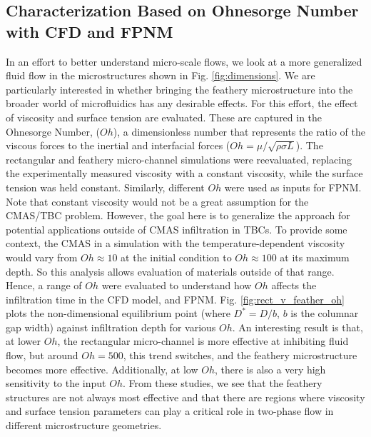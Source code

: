 \documentclass{UCF_ETD}
\begin{document}
\subsection{Characterization Based on Ohnesorge Number with CFD and FPNM}

In an effort to better understand micro-scale flows, we look at a more generalized fluid flow in the microstructures shown in Fig. \ref{fig:dimensions}. We are particularly interested in whether bringing the feathery microstructure into the broader world of microfluidics has any desirable effects. For this effort, the effect of viscosity and surface tension are evaluated. These are captured in the Ohnesorge Number, ($Oh$), a dimensionless number that represents the ratio of the viscous forces to the inertial and interfacial forces ($Oh = \mu / \sqrt{\rho \sigma L}$). 
The rectangular and feathery micro-channel simulations were reevaluated, replacing the experimentally measured viscosity with a constant viscosity, while the surface tension was held constant.
Similarly, different $Oh$ were used as inputs for FPNM.
Note that constant viscosity would not be a great assumption for the CMAS/TBC problem. However, the goal here is to generalize the approach for potential applications outside of CMAS infiltration in TBCs.
To provide some context, the CMAS in a simulation with the temperature-dependent viscosity would vary from 
$Oh\approx 10$ at the initial condition to $Oh \approx 100$ at its maximum depth. So this analysis allows evaluation of materials outside of that range.
Hence, a range of $Oh$ were evaluated to understand how $Oh$ affects the infiltration time in the CFD model, and FPNM. 
Fig. \ref{fig:rect_v_feather_oh} plots the non-dimensional equilibrium point (where $D^{*} = D/b$, $b$ is the columnar gap width) against infiltration depth for various $Oh$. 
An interesting result is that, at lower $Oh$, the rectangular micro-channel is more effective at inhibiting fluid flow, but around $Oh=500$, this trend switches, and the feathery microstructure becomes more effective. Additionally, at low $Oh$, there is also a very high sensitivity to the input $Oh$.  
From these studies, we see that the feathery structures are not always most effective and that there are regions where viscosity and surface tension parameters can play a critical role in two-phase flow in different microstructure geometries. 
\end{document}
